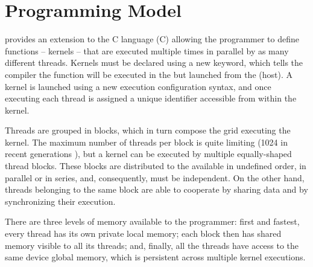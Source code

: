 \documentclass[../thesis]{subfiles}
\begin{document}
	\section{Programming Model}
	\label{sec:cuda:model}
	
	\cuda provides an extension to the C language (\cuda C) allowing the programmer to define functions -- kernels -- that are executed multiple times in parallel by as many different \cuda threads. Kernels must be declared using a new keyword, which tells the compiler the function will be executed in the \gpu but launched from the \cpu (host). A kernel is launched using a new execution configuration syntax, and once executing each thread is assigned a unique identifier accessible from within the kernel.


	Threads are grouped in blocks, which in turn compose the grid executing the kernel. The maximum number of threads per block is quite limiting (1024 in recent generations \cite{NVIDIA:KEPLER}), but a kernel can be executed by multiple equally-shaped thread blocks. These blocks are distributed to the available \sms in undefined order, in parallel or in series, and, consequently, must be independent. On the other hand, threads belonging to the same block are able to cooperate by sharing data and by synchronizing their execution.

	There are three levels of memory available to the programmer: first and fastest, every thread has its own private local memory; each block then has shared memory visible to all its threads; and, finally, all the threads have access to the same device global memory, which is persistent across multiple kernel executions.
\end{document}
